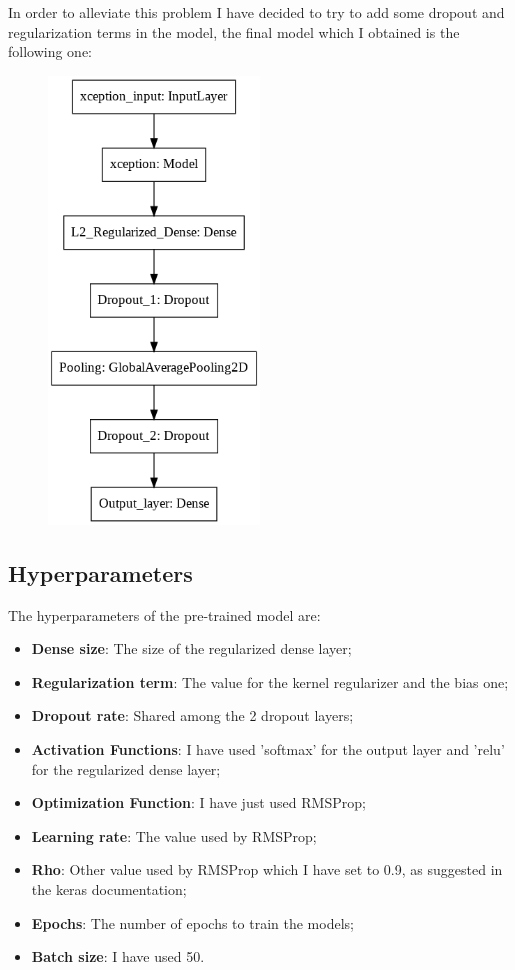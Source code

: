 \documentclass[a4paper]{article}
\begin{document}
\newpage
In order to alleviate this problem I have decided to try to add some dropout and regularization terms in the model, the final model which I obtained is the following one:

\begin{figure} [h!]
\centering
\includegraphics[width=0.5\textwidth]{final_model.png}
\label{fig: final_model}
\end{figure}

\subsection{Hyperparameters}
The hyperparameters of the pre-trained model are:
\begin{itemize}
\item \textbf{Dense size}: The size of the regularized dense layer;
\item \textbf{Regularization term}: The value for the kernel regularizer and the bias one;
\item \textbf{Dropout rate}: Shared among the 2 dropout layers;
\item \textbf{Activation Functions}: I have used 'softmax' for the output layer and 'relu' for the regularized dense layer;
\item \textbf{Optimization Function}: I have just used RMSProp;
\item \textbf{Learning rate}: The value used by RMSProp;
\item \textbf{Rho}: Other value used by RMSProp which I have set to 0.9, as suggested in the keras documentation;
\item \textbf{Epochs}: The number of epochs to train the models;
\item \textbf{Batch size}: I have used 50.
\end{itemize}
\end{document}
